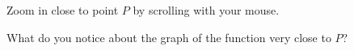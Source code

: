\documentclass{ximera}
\begin{document}
\begin{exploration}\label{exp:angles2}
Zoom in close to point $P$ by scrolling with your mouse. 
\begin{question} \label{Q1:LF}
What do you notice about the graph of the function very close to $P$?
\end{question}

 
\begin{onlineOnly}
    \begin{center}
\end{center}
\end{onlineOnly}
\end{exploration}
\end{document}
